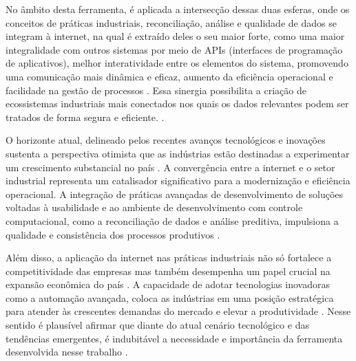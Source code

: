 No âmbito desta ferramenta, é aplicada a intersecção dessas duas esferas, onde os conceitos de práticas industriais, reconciliação, análise e qualidade de dados se integram à internet, na qual é extraído deles o seu maior forte, como uma maior integralidade com outros sistemas por meio de APIs (interfaces de programação de aplicativos), melhor interatividade entre os elementos do sistema, promovendo uma comunicação mais dinâmica e eficaz, aumento da eficiência operacional e facilidade na gestão de processos \cite{industry4}. Essa sinergia possibilita a criação de ecossistemas industriais mais conectados nos quais os dados relevantes podem ser tratados de forma segura e eficiente. \cite{industrybuild}.
    
O horizonte atual, delineado pelos recentes avanços tecnológicos e inovações sustenta a perspectiva otimista que as indústrias estão destinadas a experimentar um crescimento substancial no país \cite{industrychina}. A convergência entre a internet e o setor industrial representa um catalisador significativo para a modernização e eficiência operacional. A integração de práticas avançadas de desenvolvimento de soluções voltadas à usabilidade e ao ambiente de desenvolvimento com controle computacional, como a reconciliação de dados e análise preditiva, impulsiona a qualidade e consistência dos processos produtivos \cite{industrydigital}.
    
Além disso, a aplicação da internet nas práticas industriais não só fortalece a competitividade das empresas mas também desempenha um papel crucial na expansão econômica do país \cite{industryiot}. A capacidade de adotar tecnologias inovadoras como a automação avançada, coloca as indústrias em uma posição estratégica para atender às crescentes demandas do mercado e elevar a produtividade \cite{industryinternet}. Nesse sentido é plausível afirmar que diante do atual cenário tecnológico e das tendências emergentes, é indubitável a necessidade e importância da ferramenta desenvolvida nesse trabalho \cite{industrychina}.